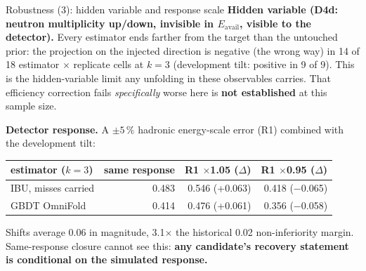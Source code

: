 \documentclass[aspectratio=169,10pt]{beamer}
\def\evidencetext{}
\begin{document}
\gdef\evidencetext{\texttt{phase\_e/results/references.json}; \texttt{../configuration\_comparison/campaign\_report.json}}
\begin{frame}{Robustness (3): hidden variable and response scale}
\textbf{Hidden variable (D4d: neutron multiplicity up/down, invisible in $E_{\mathrm{avail}}$, visible to the
detector).} Every estimator ends farther from the target than the untouched prior: the projection on the injected
direction is negative (the wrong way) in 14 of 18 estimator $\times$ replicate
cells at $k=3$ (development tilt: positive in 9 of 9). This is the
hidden-variable limit any unfolding in these observables carries. That efficiency correction fails
\emph{specifically} worse here is \textbf{not established} at this sample size.\par\vspace{6pt}
\textbf{Detector response.} A $\pm5\,\%$ hadronic energy-scale error (R1) combined with the development tilt:
\begin{center}
{\footnotesize
\begin{tabular}{lrrr}
\toprule
estimator ($k=3$) & same response & R1 $\times$1.05 ($\Delta$) & R1 $\times$0.95 ($\Delta$) \\
\midrule
IBU, misses carried & 0.483 & 0.546 (+0.063) & 0.418 (\ensuremath{-}0.065) \\
GBDT OmniFold & 0.414 & 0.476 (+0.061) & 0.356 (\ensuremath{-}0.058) \\
\bottomrule
\end{tabular}}
\end{center}
Shifts average 0.06 in magnitude, 3.1\ensuremath{\times} the historical 0.02
non-inferiority margin. Same-response closure cannot see this: \textbf{any candidate's recovery statement is
conditional on the simulated response.}
\end{frame}
\end{document}
